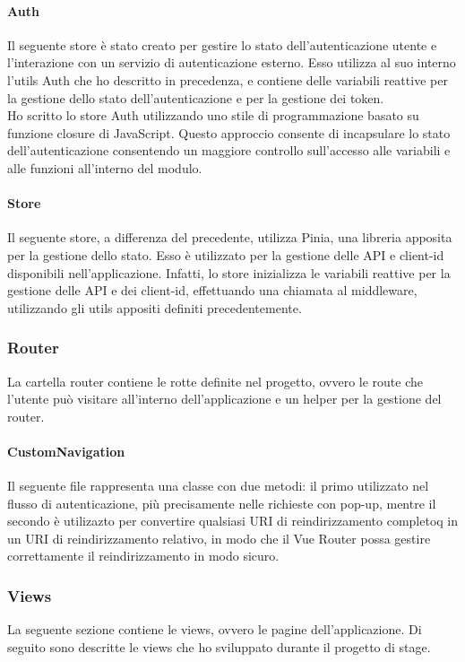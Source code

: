 \paragraph{Auth}\label{par:auth-store}
Il seguente store è stato creato per gestire lo stato dell'autenticazione utente e l'interazione con un servizio di autenticazione esterno.
Esso utilizza al suo interno l'utils Auth che ho descritto in precedenza, e contiene delle variabili reattive per la gestione dello stato dell'autenticazione
e per la gestione dei token.\\
Ho scritto lo store Auth utilizzando uno stile di programmazione basato su funzione closure di JavaScript. Questo approccio consente di incapsulare
lo stato dell'autenticazione consentendo un maggiore controllo sull'accesso alle variabili e alle funzioni all'interno del modulo.

\paragraph{Store}\label{par:store}
Il seguente store, a differenza del precedente, utilizza Pinia, una libreria apposita per la gestione dello stato.
Esso è utilizzato per la gestione delle API e client-id disponibili nell'applicazione. Infatti, lo store inizializza le variabili reattive per la gestione
delle API e dei client-id, effettuando una chiamata al middleware, utilizzando gli utils appositi definiti precedentemente.

\subsubsection{Router}\label{subsubsec:router}
La cartella router contiene le rotte definite nel progetto, ovvero le route che l'utente può visitare all'interno dell'applicazione e un helper per la gestione del router.
\paragraph{CustomNavigation}\label{par:custom-navigation}
Il seguente file rappresenta una classe con due metodi: il primo utilizzato nel flusso di autenticazione, più precisamente nelle richieste con pop-up,
mentre il secondo è utilizazto per convertire qualsiasi URI di reindirizzamento completoq in un URI di reindirizzamento relativo, in modo che il Vue Router
possa gestire correttamente il reindirizzamento in modo sicuro.

\subsubsection{Views}\label{subsubsec:views}
La seguente sezione contiene le views, ovvero le pagine dell'applicazione.
Di seguito sono descritte le views che ho sviluppato durante il progetto di stage.

